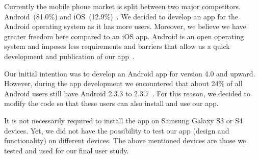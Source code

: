 \begin{description}[leftmargin=0cm]
	\item[Android:] Currently the mobile phone market is split between two major competitors. Android~(81.0\%) and iOS~(12.9\%)~\cite{androidiosmarketshare}. 
	We decided to develop an app for the Android operating system as it has more users. Moreover, we believe we have greater freedom here compared to an iOS app. 
 	Android is an open operating system and imposes less requirements and barriers that allow us a quick development and publication of our app~\cite{publishios, publishandroid}. 
	\item[Version:] Our initial intention was to develop an Android app for version 4.0 and upward.
 However, during the app development we encountered that about 24\% of all Android users still have Android 2.3.3 to 2.3.7~\cite{versionsandroid}. For this reason, we decided to modify the code so that these users can also install and use our app.
	\item[Samsung Galaxy S3 or S4:] It is not necessarily required to install the app on Samsung Galaxy S3 or S4 devices. 
Yet, we did not have the possibility to test our app (design and functionality) on different devices.
The above mentioned devices are those we tested and used for our final user study.
\end{description}

